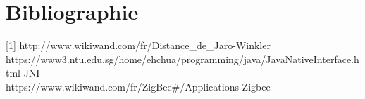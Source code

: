 \chapter*{Bibliographie}

[1] http://www.wikiwand.com/fr/Distance_de_Jaro-Winkler \\
[2] https://www3.ntu.edu.sg/home/ehchua/programming/java/JavaNativeInterface.html JNI \\
[3] https://www.wikiwand.com/fr/ZigBee#/Applications Zigbee